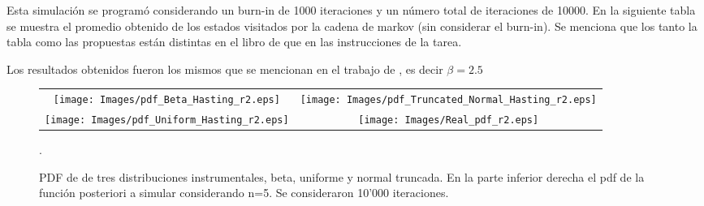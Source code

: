 \documentclass[preprint,12pt]{elsarticle}
\begin{document}
Esta simulación se programó considerando un burn-in de 1000 iteraciones y un número total de iteraciones de 10000.
%
En la siguiente tabla se muestra el promedio obtenido de los estados visitados por la cadena de markov (sin considerar el burn-in).
%
Se menciona que los tanto la tabla como las propuestas están distintas en el libro \cite{robert2010introducing} de que en las instrucciones de la tarea.
%
\begin{table}[]
\end{table}

Los resultados obtenidos fueron los mismos que se mencionan en el trabajo de \cite{norton2018sampling}, es decir $\beta = 2.5$

\begin{figure}[H]
\centering
\begin{tabular}{c c}
\texttt{[image: Images/pdf\_Beta\_Hasting\_r2.eps]}      &\texttt{[image: Images/pdf\_Truncated\_Normal\_Hasting\_r2.eps]}   \\
\texttt{[image: Images/pdf\_Uniform\_Hasting\_r2.eps]}      &\texttt{[image: Images/Real\_pdf\_r2.eps]}  
\end{tabular}
\caption{PDF de de tres distribuciones instrumentales, beta, uniforme y normal truncada. En la parte inferior derecha el pdf de la función posteriori a simular considerando n=5. Se consideraron 10'000 iteraciones.} \label{fig2}.
\end{figure}


\linenumbers
\end{document}

